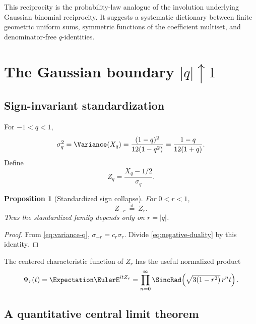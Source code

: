 \documentclass[11pt]{article}
\newtheorem{proposition}[theorem]{Proposition}
\theoremstyle{definition}
\newcommand{\doteqL}{\mathrel{\stackrel{\mathrm d}=}}
\begin{document}
This reciprocity is the probability-law analogue of the involution underlying Gaussian
binomial reciprocity.  It suggests a systematic dictionary between finite geometric
uniform sums, symmetric functions of the coefficient multiset, and denominator-free
$q$-identities.

\section{The Gaussian boundary \texorpdfstring{$\lvert q\rvert\uparrow1$}{|q| -> 1}}

\subsection{Sign-invariant standardization}

For \(-1<q<1\),
\begin{equation}
 \sigma_q^2=\Variance(X_q)
 =\frac{(1-q)^2}{12(1-q^2)}
 =\frac{1-q}{12(1+q)}.                                    \label{eq:variance-q}
\end{equation}
Define
\begin{equation}
 Z_q=\frac{X_q-1/2}{\sigma_q}.                             \label{eq:Zq}
\end{equation}

\begin{proposition}[Standardized sign collapse]\label{prop:standard-sign}
For \(0<r<1\),
\begin{equation}
 \boxed{Z_{-r}\ \doteqL\ Z_r.}                           \label{eq:standard-sign}
\end{equation}
Thus the standardized family depends only on \(r=\lvert q\rvert\).
\end{proposition}

\begin{proof}
From \cref{eq:variance-q}, \(\sigma_{-r}=c_r\sigma_r\).  Divide
\cref{eq:negative-duality} by this identity.
\end{proof}

The centered characteristic function of \(Z_r\) has the useful normalized product
\begin{equation}
 \Psi_r(t)=\Expectation \EulerE^{itZ_r}
 =\prod_{n=0}^{\infty}
 \SincRad\!\left(\sqrt{3(1-r^2)}\,r^nt\right).              \label{eq:standardized-sinc}
\end{equation}

\subsection{A quantitative central limit theorem}
\end{document}

